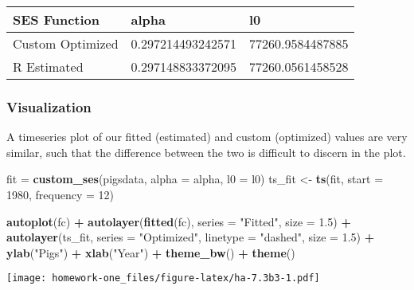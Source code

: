 \documentclass[openany]{book}
\newenvironment{Shaded}{\begin{snugshade}}{\end{snugshade}}
\newcommand{\DataTypeTok}[1]{\textcolor[rgb]{0.13,0.29,0.53}{#1}}
\newcommand{\DecValTok}[1]{\textcolor[rgb]{0.00,0.00,0.81}{#1}}
\newcommand{\FloatTok}[1]{\textcolor[rgb]{0.00,0.00,0.81}{#1}}
\newcommand{\KeywordTok}[1]{\textcolor[rgb]{0.13,0.29,0.53}{\textbf{#1}}}
\newcommand{\NormalTok}[1]{#1}
\newcommand{\OperatorTok}[1]{\textcolor[rgb]{0.81,0.36,0.00}{\textbf{#1}}}
\newcommand{\StringTok}[1]{\textcolor[rgb]{0.31,0.60,0.02}{#1}}
\begin{document}
\begingroup\fontsize{10}{12}\selectfont

\begin{tabu} to 
\hline
SES Function & alpha & l0\\
\hline
{}  Custom Optimized & 0.297214493242571 & 77260.9584487885\\
\hline
R Estimated & 0.297148833372095 & 77260.0561458528\\
\hline
\end{tabu}
\endgroup{}

\hypertarget{visualization-1}{%
\subsubsection{Visualization}\label{visualization-1}}

A timeseries plot of our fitted (estimated) and custom (optimized) values are very similar, such that the difference between the two is difficult to discern in the plot.

\begin{Shaded}
\begin{Highlighting}[]
\NormalTok{fit =}\StringTok{ }\KeywordTok{custom_ses}\NormalTok{(pigsdata, }\DataTypeTok{alpha =}\NormalTok{ alpha, }\DataTypeTok{l0 =}\NormalTok{ l0)}
\NormalTok{ts_fit <-}\StringTok{ }\KeywordTok{ts}\NormalTok{(fit, }\DataTypeTok{start =} \DecValTok{1980}\NormalTok{, }\DataTypeTok{frequency =} \DecValTok{12}\NormalTok{)}

\KeywordTok{autoplot}\NormalTok{(fc) }\OperatorTok{+}\StringTok{ }\KeywordTok{autolayer}\NormalTok{(}\KeywordTok{fitted}\NormalTok{(fc), }\DataTypeTok{series =} \StringTok{"Fitted"}\NormalTok{, }\DataTypeTok{size =} \FloatTok{1.5}\NormalTok{) }\OperatorTok{+}\StringTok{ }
\StringTok{  }\KeywordTok{autolayer}\NormalTok{(ts_fit, }\DataTypeTok{series =} \StringTok{"Optimized"}\NormalTok{, }\DataTypeTok{linetype =} \StringTok{"dashed"}\NormalTok{, }
    \DataTypeTok{size =} \FloatTok{1.5}\NormalTok{) }\OperatorTok{+}\StringTok{ }\KeywordTok{ylab}\NormalTok{(}\StringTok{"Pigs"}\NormalTok{) }\OperatorTok{+}\StringTok{ }\KeywordTok{xlab}\NormalTok{(}\StringTok{"Year"}\NormalTok{) }\OperatorTok{+}\StringTok{ }\KeywordTok{theme_bw}\NormalTok{() }\OperatorTok{+}\StringTok{ }
\StringTok{  }\KeywordTok{theme}\NormalTok{()}
\end{Highlighting}
\end{Shaded}

\texttt{[image: homework-one\_files/figure-latex/ha-7.3b3-1.pdf]}
\end{document}
